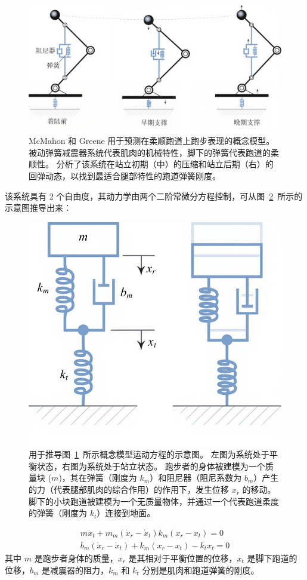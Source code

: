 \begin{figure}[!htb]
	\centering
	\includegraphics[width=1.0\linewidth]{chap3/3_10}
	\caption{McMahon 和 Greene 用于预测在柔顺跑道上跑步表现的概念模型。
		被动弹簧减震器系统代表肌肉的机械特性，脚下的弹簧代表跑道的柔顺性。
		分析了该系统在站立初期（中）的压缩和站立后期（右）的回弹动态，以找到最适合腿部特性的跑道弹簧刚度\cite{mcmahon1979influence}。 \label{fig:3_10}}
\end{figure}

该系统具有 2 个自由度，其动力学由两个二阶常微分方程控制，可从图~\ref{fig:3_11}~所示的示意图推导出来：

\begin{figure}[!htb]
	\centering
	\includegraphics[width=0.4\linewidth]{chap3/3_11}
	\caption{用于推导图~\ref{fig:3_10}~所示概念模型运动方程的示意图。
		左图为系统处于平衡状态，右图为系统处于站立状态。
		跑步者的身体被建模为一个质量块 ($m$)，其在弹簧（刚度为 $k_m$）和阻尼器（阻尼系数为 $b_m$）产生的力（代表腿部肌肉的综合作用）的作用下，发生位移 $x_r$ 的移动。
		脚下的小块跑道被建模为一个无质量物体，并通过一个代表跑道柔度的弹簧（刚度为 $k_t$）连接到地面\cite{mcmahon1979influence}。 \label{fig:3_11}}
\end{figure}

\begin{equation}
\begin{aligned}
	m \ddot{x}_t + 
	m_m ( \dot{x}_r - \dot{x}_t )
	k_m ( x_r - x_t ) = 0 \\
	b_m ( \dot{x}_r - \dot{x}_t )
	+ k_m ( x_r - x_t ) 
	- k_t x_t = 0
\end{aligned}
\end{equation}
% 
其中 $m$ 是跑步者身体的质量，$x_r$ 是其相对于平衡位置的位移，$x_t$ 是脚下跑道的位移，$b_m$ 是减震器的阻力，$k_m$ 和 $k_t$ 分别是肌肉和跑道弹簧的刚度。


